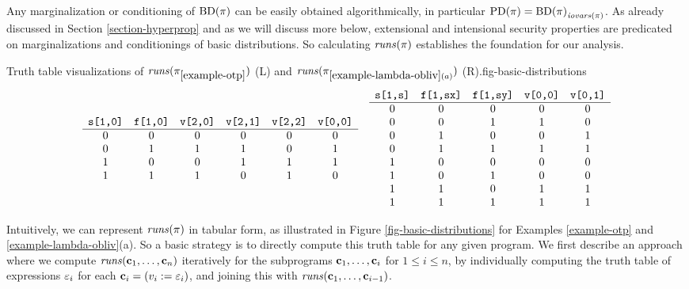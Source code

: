 Any marginalization or conditioning of $\mathrm{BD}(\pi)$ can be easily
obtained algorithmically, in particular $\mathrm{PD}(\pi) =
{\mathrm{BD}(\pi)}_{\mathit{iovars}(\pi)}$.  As already discussed in Section
\ref{section-hyperprop} and as we will discuss more below, extensional
and intensional security properties are predicated on marginalizations
and conditionings of basic distributions. So calculating
$\mathit{runs}(\pi)$ establishes the foundation for our analysis.

\begin{fpfig}[t]{Truth table visualizations of $\mathit{runs}(\pi_{\ref{example-otp}})$ (L) and
    $\mathit{runs}(\pi_{\ref{example-lambda-obliv}(a)})$ (R).}{fig-basic-distributions}
{\footnotesize
  $$
  \begin{array}{cc}
    \begin{array}{cccccc}
      \verb+s[1,0]+ & \verb+f[1,0]+ & \verb+v[2,0]+  & \verb+v[2,1]+ & \verb+v[2,2]+ & \verb+v[0,0]+\\
      \hline
      0 & 0 & 0 & 0 & 0 & 0 \\ 
      0 & 1 & 1 & 1 & 0 & 1 \\ 
      1 & 0 & 0 & 1 & 1 & 1 \\ 
      1 & 1 & 1 & 0 & 1 & 0
    \end{array}
    & 
    \begin{array}{ccccc}
      \verb+s[1,s]+ & \verb+f[1,sx]+ & \verb+f[1,sy]+ & \verb+v[0,0]+ & \verb+v[0,1]+ \\
      \hline
      0 & 0 & 0 & 0 & 0 \\ 
      0 & 0 & 1 & 1 & 0 \\ 
      0 & 1 & 0 & 0 & 1 \\ 
      0 & 1 & 1 & 1 & 1 \\
      1 & 0 & 0 & 0 & 0 \\ 
      1 & 0 & 1 & 0 & 0 \\ 
      1 & 1 & 0 & 1 & 1 \\ 
      1 & 1 & 1 & 1 & 1  
    \end{array}
  \end{array}
  $$
}
\end{fpfig}

Intuitively, we can represent $\mathit{runs}(\pi)$ in tabular form, as
illustrated in Figure \ref{fig-basic-distributions} for Examples
\ref{example-otp} and \ref{example-lambda-obliv}(a). So a basic
strategy is to directly compute this truth table for any given
program. We first describe an approach where we compute
$\mathit{runs}(\mathbf{c}_1,\ldots,\mathbf{c}_n)$ iteratively for the subprograms
$\mathbf{c}_1,\ldots,\mathbf{c}_i$ for $1 \le i \le n$, by individually
computing the truth table of expressions $\varepsilon_i$ for each $\mathbf{c}_i =
(v_i := \varepsilon_i)$, and joining this with
$\mathit{runs}(\mathbf{c}_1,\ldots,\mathbf{c}_{i-1})$.

